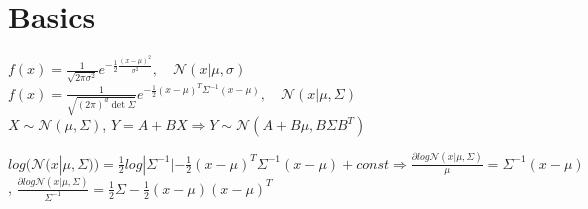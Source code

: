 \section{Basics}
$f(x) = \frac{1}{\sqrt{2\pi \sigma^2}} e^{- \frac{1}{2} \frac{(x-\mu)^2}{\sigma^2}},\quad \mathcal{N}(x|\mu, \sigma)$\\
$f(x) = \frac{1}{\sqrt{(2\pi)^d\det\Sigma}} e^{- \frac{1}{2} (x-\mu)^T \Sigma^{-1} (x-\mu)},\quad \mathcal{N}(x|\mu, \Sigma)$\\
$X {\sim} \mathcal{N}(\mu,\Sigma)$, $Y{=}A{+}BX \Rightarrow Y{\sim}\mathcal{N}(A{+}B\mu,B\Sigma B^T)$

$log(\mathcal{N}(x|\mu, \Sigma)) = \frac{1}{2}log|\Sigma^{-1}|- \frac{1}{2}(x - \mu)^T\Sigma^{-1}(x - \mu) + const \Rightarrow \frac{\partial log\mathcal{N}(x|\mu, \Sigma)}{\mu} = \Sigma^{-1}(x - \mu)$, $\frac{\partial log\mathcal{N}(x|\mu, \Sigma)}{\Sigma^{-1}} = \frac{1}{2}\Sigma - \frac{1}{2}(x - \mu)(x - \mu)^T$

